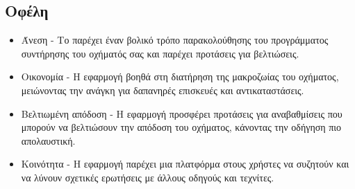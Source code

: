 \documentclass[11pt]{scrartcl} %
\begin{document}
\subsection*{Οφέλη}
    \begin{itemize}
        \item Άνεση - Το  παρέχει έναν βολικό τρόπο παρακολούθησης του προγράμματος συντήρησης του οχήματός σας και παρέχει προτάσεις για βελτιώσεις.
        \item Οικονομία - Η εφαρμογή βοηθά στη διατήρηση της μακροζωίας του οχήματος, μειώνοντας την ανάγκη για δαπανηρές επισκευές και αντικαταστάσεις.
        \item Βελτιωμένη απόδοση - Η εφαρμογή προσφέρει προτάσεις για αναβαθμίσεις που μπορούν να βελτιώσουν την απόδοση του οχήματος, κάνοντας την οδήγηση πιο απολαυστική.
        \item Κοινότητα - Η εφαρμογή παρέχει μια πλατφόρμα στους χρήστες να συζητούν και να λύνουν σχετικές ερωτήσεις με άλλους οδηγούς και τεχνίτες.
    \end{itemize}

% 
\end{document}
